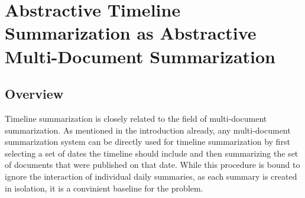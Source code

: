\documentclass[a4paper,BCOR=10mm]{report}
\numberwithin{lemma}{chapter}
\numberwithin{definition}{chapter}
\begin{document}










\chapter{Abstractive Timeline Summarization as Abstractive Multi-Document Summarization}

\section{Overview}

Timeline summarization is closely related to the field of multi-document summarization. As mentioned in the introduction already, any multi-document summarization system can be directly used for timeline summarization by first selecting a set of dates the timeline should include and then summarizing the set of documents that were published on that date.
While this procedure is bound to ignore the interaction of individual daily summaries, as each summary is created in isolation, it is a convinient baseline for the problem.
\end{document}
